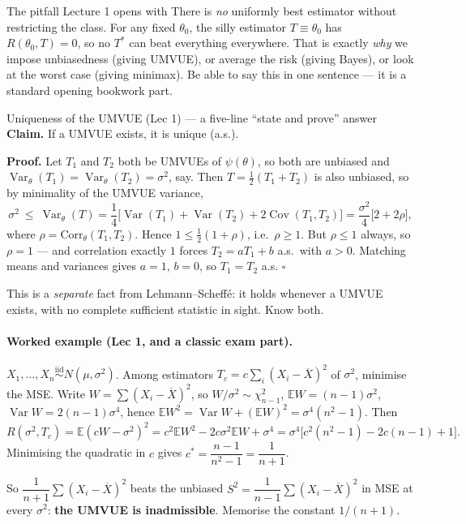 \documentclass[11pt]{article}
\theoremstyle{remark}
\newcommand{\E}{\mathbb{E}}
\newcommand{\Var}{\operatorname{Var}}
\newcommand{\Cov}{\operatorname{Cov}}
\newcommand{\Xbar}{\overline{X}}
\newcommand{\iid}{\overset{\text{iid}}{\sim}}
\begin{document}
\begin{warnbox}{The pitfall Lecture 1 opens with}
There is \emph{no} uniformly best estimator without restricting the class. For any fixed
$\theta_0$, the silly estimator $T\equiv\theta_0$ has $R(\theta_0,T)=0$, so no $T^*$ can
beat everything everywhere. That is exactly \emph{why} we impose unbiasedness (giving UMVUE),
or average the risk (giving Bayes), or look at the worst case (giving minimax). Be able to
say this in one sentence --- it is a standard opening bookwork part.
\end{warnbox}

\begin{keybox}{Uniqueness of the UMVUE (Lec 1) --- a five-line ``state and prove'' answer}
\textbf{Claim.} If a UMVUE exists, it is unique (a.s.).

\smallskip
\textbf{Proof.} Let $T_1$ and $T_2$ both be UMVUEs of $\psi(\theta)$, so both are unbiased and
$\Var_\theta(T_1)=\Var_\theta(T_2)=\sigma^2$, say. Then $T=\tfrac12(T_1+T_2)$ is also
unbiased, so by minimality of the UMVUE variance,
\[
\sigma^{2}\ \le\ \Var_\theta(T)=\frac14\big[\Var(T_1)+\Var(T_2)+2\Cov(T_1,T_2)\big]
=\frac{\sigma^{2}}{4}\big[2+2\rho\big],
\]
where $\rho=\mathrm{Corr}_\theta(T_1,T_2)$. Hence $1\le\tfrac12(1+\rho)$, i.e.\ $\rho\ge1$.
But $\rho\le1$ always, so $\rho=1$ --- and correlation exactly $1$ forces $T_2=aT_1+b$ a.s.\
with $a>0$. Matching means and variances gives $a=1$, $b=0$, so $T_1=T_2$ a.s. $\square$

\smallskip
This is a \emph{separate} fact from Lehmann--Scheff\'e: it holds whenever a UMVUE exists,
with no complete sufficient statistic in sight. Know both.
\end{keybox}

\paragraph{Worked example (Lec 1, and a classic exam part).}
$X_1,\dots,X_n\iid N(\mu,\sigma^2)$. Among estimators $T_c=c\sum_{i}(X_i-\Xbar)^2$ of
$\sigma^2$, minimise the MSE. Write $W=\sum(X_i-\Xbar)^2$, so $W/\sigma^2\sim\chi^2_{n-1}$,
$\E W=(n-1)\sigma^2$, $\Var W=2(n-1)\sigma^4$, hence
$\E W^2=\Var W+(\E W)^2=\sigma^4(n^2-1)$. Then
\[
R(\sigma^2,T_c)=\E(cW-\sigma^2)^2=c^2\E W^2-2c\sigma^2\E W+\sigma^4
=\sigma^4\big[c^2(n^2-1)-2c(n-1)+1\big].
\]
Minimising the quadratic in $c$ gives $c^*=\dfrac{n-1}{n^2-1}=\dfrac{1}{n+1}$.

So $\dfrac{1}{n+1}\sum(X_i-\Xbar)^2$ beats the unbiased $S^2=\dfrac{1}{n-1}\sum(X_i-\Xbar)^2$
in MSE at every $\sigma^2$: \textbf{the UMVUE is inadmissible}. Memorise the constant $1/(n+1)$.
\end{document}
